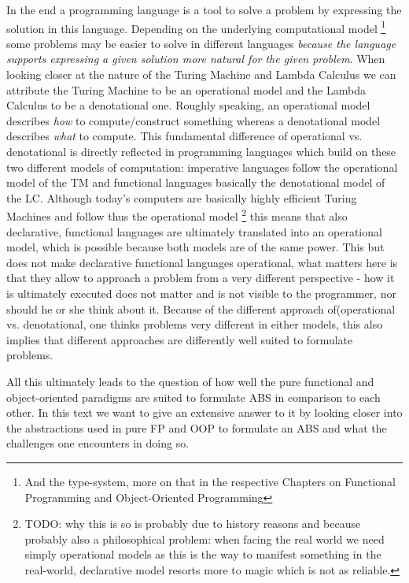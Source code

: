 In the end a programming language is a tool to solve a problem by expressing the solution in this language. Depending on the underlying computational model \footnote{And the type-system, more on that in the respective Chapters on Functional Programming and Object-Oriented Programming} some problems may be easier to solve in different languages \textit{because the language supports expressing a given solution more natural for the given problem}.
When looking closer at the nature of the Turing Machine and Lambda Calculus we can attribute the Turing Machine to be an operational model and the Lambda Calculus to be a denotational one. Roughly speaking, an operational model describes \textit{how} to compute/construct something whereas a denotational model describes \textit{what} to compute.
This fundamental difference of operational vs. denotational is directly reflected in programming languages which build on these two different models of computation: imperative languages follow the operational model of the TM and functional languages basically the denotational model of the LC.
Although today's computers are basically highly efficient Turing Machines and follow thus the operational model \footnote{TODO: why this is so is probably due to history reasons and because probably also a philosophical problem: when facing the real world we need simply operational models as this is the way to manifest something in the real-world, declarative model resorts more to magic which is not as reliable.} this means that also declarative, functional languages are ultimately translated into an operational model, which is possible because both models are of the same power. This but does not make declarative functional languages operational, what matters here is that they allow to approach a problem from a very different perspective - how it is ultimately executed does not matter and is not visible to the programmer, nor should he or she think about it.
Because of the different approach of(operational vs. denotational, one thinks problems very different in either models, this also implies that different approaches are differently well suited to formulate problems.

All this ultimately leads to the question of how well the pure functional and object-oriented paradigms are suited to formulate ABS in comparison to each other. In this text we want to give an extensive answer to it by looking closer into the abstractions used in pure FP and OOP to formulate an ABS and what the challenges one encounters in doing so.


